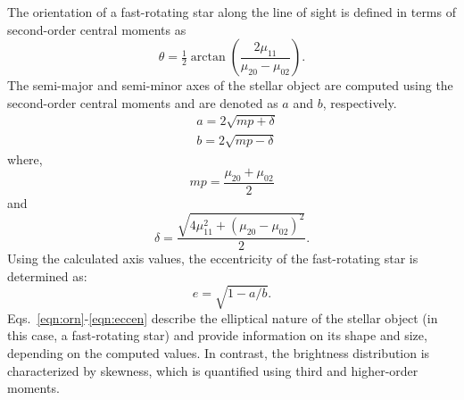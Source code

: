 The orientation of a fast-rotating star along the line of sight is defined in terms of second-order central moments as
\begin{equation}
	\theta = \tfrac{1}{2}\arctan \left(\frac{2\mu_{11}}{\mu_{20} - \mu_{02}}\right).
	\label{eqn:orn}
\end{equation}
The semi-major and semi-minor axes of the stellar object are computed using the second-order central moments and are denoted as \(a\) and \(b\), respectively.
\begin{equation}
	\begin{aligned}
		&a = 2\sqrt{mp + \delta} \\
		&b = 2\sqrt{mp - \delta}
	\end{aligned}
	\label{eqn:semi}
\end{equation}
where,
\begin{equation}
	mp = \frac{\mu_{20} + \mu_{02}}{2}
	\label{eqn:mp}
\end{equation}
and
\begin{equation}
	\delta = \frac{\sqrt{4\mu_{11}^2 + (\mu_{20} - \mu_{02})^2}}{2}.	
	\label{eqn:delta}
\end{equation}
Using the calculated axis values, the eccentricity of the fast-rotating star is determined as:
\begin{equation}
	e = \sqrt{1 - a/b}.
	\label{eqn:eccen}
\end{equation}
Eqs.~\ref{eqn:orn}-\ref{eqn:eccen} describe the elliptical nature of the stellar object (in this case, a fast-rotating star) and provide information on its shape and size, depending on the computed values. In contrast, the brightness distribution is characterized by skewness, which is quantified using third and higher-order moments.

